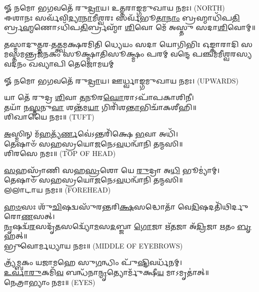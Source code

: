 \begin{center}
𑍐 𑌨𑌮𑍋 𑌭𑌗𑌵𑌤𑍇᳴ 𑌰𑍁\-\ul{𑌦𑍍𑌰𑌾}\-𑌯। 𑌉𑌤𑍍𑌤𑌰𑌾𑌙𑍍𑌗𑌮𑍁𑌖𑌾𑌯 𑌨𑌮𑌃। {\scriptsize (NORTH)}\\[1em]

𑌈𑌶𑌾𑌨𑌃 𑌸𑌰𑍍𑌵᳴𑌵𑌿\-\ul{𑌦𑍍𑌯𑌾}\-\-\ul{𑌨𑌾}\-𑌮𑍀𑌶𑍍𑌵𑌰𑌃 𑌸𑌰𑍍𑌵᳴𑌭𑍂\-\ul{𑌤𑌾}\-\-\ul{𑌨𑌾𑌂} 𑌬𑍍𑌰𑌹𑍍𑌮𑌾𑌧𑌿᳴𑌪\-\ul{𑌤𑌿}\-𑌰𑍍𑌬𑍍𑌰\-\ul{𑌹𑍍𑌮}\-𑌣𑍋𑌽𑌧𑌿᳴𑌪\-\ul{𑌤𑌿}\-𑌰𑍍𑌬𑍍𑌰𑌹𑍍𑌮𑌾᳴ \ul{𑌶𑌿}\-𑌵𑍋 𑌮𑍇᳴ 𑌅𑌸𑍍𑌤𑍁 𑌸𑌦𑌾\-\ul{𑌶𑌿}\-𑌵𑍋𑌮𑍍॥

{𑌤𑌸𑍍𑌮𑌾𑌦𑍁𑌤𑍍𑌤𑌰-𑌤𑌤𑍍𑌤𑍍𑌵𑌮𑌕𑍍𑌷𑌰𑌮𑌿𑌤𑌿 𑌧𑍍𑌯𑍇𑌯𑌂 𑌸𑌦𑌾 𑌯𑍋𑌗𑌿𑌭𑌿𑌃}
{𑌓𑌙𑍍𑌕𑌾𑌰𑌾𑌦𑌿 𑌸𑌮𑌸𑍍𑌤𑌮𑌨𑍍𑌤𑍍𑌰𑌜𑌨𑌕𑌂 𑌸𑍂𑌕𑍍𑌷𑍍𑌮𑌾𑌤𑌿𑌸𑍂𑌕𑍍𑌷𑍍𑌮𑌂 𑌪𑌰𑌮𑍍}
{𑌵𑌨𑍍𑌦𑍇 𑌪𑌞𑍍𑌚𑌮𑌮𑍀𑌶𑍍𑌵𑌰𑌸𑍍𑌯 𑌵𑌦𑌨𑌂 𑌖𑌵𑍍𑌯𑌾𑌪𑌿 𑌤𑍇𑌜𑍋𑌮𑌯𑌮𑍍}

𑍐 𑌨𑌮𑍋 𑌭𑌗𑌵𑌤𑍇᳴ 𑌰𑍁\-\ul{𑌦𑍍𑌰𑌾}\-𑌯। 𑌊𑌰𑍍𑌧𑍍𑌵𑌾𑌙𑍍𑌗𑌮𑍁𑌖𑌾𑌯 𑌨𑌮𑌃। {\scriptsize (UPWARDS)}\\[1em]

\end{center}


 𑌯𑌾 𑌤𑍇᳴ 𑌰𑍁𑌦𑍍𑌰 \ul{𑌶𑌿}\-𑌵𑌾 \ul{𑌤}\-𑌨𑍂𑌰\-\ul{𑌘𑍋}\-𑌰𑌾𑌽𑌪𑌾᳴𑌪𑌕𑌾𑌶𑌿𑌨𑍀।\\
 𑌤𑌯𑌾᳴ 𑌨\-\ul{𑌸𑍍𑌤}\-𑌨𑍁\-\ul{𑌵𑌾} 𑌶𑌨𑍍𑌤᳴𑌮\-\ul{𑌯𑌾} 𑌗𑌿𑌰𑌿᳴𑌶\-\ul{𑌨𑍍𑌤𑌾}\-𑌭𑌿𑌚𑌾᳴𑌕𑌶𑍀𑌹𑌿॥\\ 𑌶𑌿𑌖𑌾𑌯𑍈 𑌨𑌮𑌃॥ {\scriptsize (TUFT)}

\-\ul{𑌅}\-𑌸𑍍𑌮𑌿𑌨𑍍 𑌮᳴\-\ul{𑌹}\-𑌤𑍍𑌯᳴\-\ul{𑌰𑍍𑌣}\-𑌵𑍇॑𑌽𑌨𑍍𑌤𑌰𑌿᳴𑌕𑍍𑌷𑍇 \ul{𑌭}\-𑌵𑌾 𑌅𑌧𑌿᳴।\\
 𑌤𑍇𑌷𑌾𑍞᳴ 𑌸𑌹𑌸𑍍𑌰𑌯𑍋\-\ul{𑌜}\-𑌨𑍇𑌽\-\ul{𑌵}\-𑌧𑌨𑍍𑌵𑌾᳴𑌨𑌿 𑌤𑌨𑍍𑌮𑌸𑌿॥ \\
𑌶𑌿𑌰𑌸𑍇 𑌨𑌮𑌃॥ {\scriptsize (TOP OF HEAD)}

\-\ul{𑌸}\-𑌹𑌸𑍍𑌰𑌾᳴𑌣𑌿 𑌸𑌹\-\ul{𑌸𑍍𑌰}\-𑌶𑍋 𑌯𑍇 \ul{𑌰𑍁}\-𑌦𑍍𑌰𑌾 𑌅\-\ul{𑌧𑌿} 𑌭𑍂𑌮𑍍𑌯𑌾॑𑌮𑍍।\\
 𑌤𑍇𑌷𑌾𑍞᳴ 𑌸𑌹𑌸𑍍𑌰𑌯𑍋\-\ul{𑌜}\-𑌨𑍇𑌽\-\ul{𑌵}\-𑌧𑌨𑍍𑌵𑌾᳴𑌨𑌿 𑌤𑌨𑍍𑌮𑌸𑌿॥\\
𑌲𑌲𑌾𑌟𑌾𑌯 𑌨𑌮𑌃॥ {\scriptsize (FOREHEAD)}

\-\ul{𑌹}\-\-\ul{𑍞}\-𑌸𑌃 𑌶𑍁᳴\-\ul{𑌚𑌿}\-𑌷𑌦𑍍𑌵𑌸𑍁᳴𑌰𑌨𑍍𑌤𑌰𑌿\-\ul{𑌕𑍍𑌷}\-𑌸𑌦𑍍𑌧𑍋𑌤𑌾᳴ 𑌵𑍇\-\ul{𑌦𑌿}\-𑌷𑌦𑌤𑌿᳴𑌥𑌿𑌰𑍍𑌦𑍁𑌰𑍋\-\ul{𑌣}\-𑌸𑌤𑍍।\\
\-\ul{𑌨𑍃}\-𑌷𑌦𑍍𑌵᳴\-\ul{𑌰}\-𑌸𑌦𑍃᳴\-\ul{𑌤}\-𑌸𑌦𑍍𑌵𑍍𑌯𑍋᳴\-\ul{𑌮}\-𑌸\-\ul{𑌦}\-𑌬𑍍𑌜𑌾 \ul{𑌗𑍋}\-𑌜𑌾 𑌋᳴\-\ul{𑌤}\-𑌜𑌾 𑌅᳴\-\ul{𑌦𑍍𑌰𑌿}\-𑌜𑌾 \ul{𑌋}\-𑌤𑌂 \ul{𑌬𑍃}\-𑌹𑌤𑍍॥\\
𑌭𑍍𑌰𑍁𑌵𑍋𑌰𑍍𑌮𑌧𑍍𑌯𑌾𑌯 𑌨𑌮𑌃॥ {\scriptsize (MIDDLE OF EYEBROWS)}


𑌤𑍍𑌰𑍍𑌯᳴𑌮𑍍𑌬𑌕𑌂 𑌯𑌜𑌾𑌮𑌹𑍇 𑌸𑍁\-\ul{𑌗}\-𑌨𑍍𑌧𑌿𑌂 𑌪𑍁᳴\-\ul{𑌷𑍍𑌟𑌿}\-𑌵𑌰𑍍𑌧᳴𑌨𑌮𑍍।\\
 \ul{𑌉}\-\-\ul{𑌰𑍍𑌵𑌾}\-\-\ul{𑌰𑍁}\-𑌕𑌮𑌿᳴\-\ul{𑌵} 𑌬𑌨𑍍𑌧᳴𑌨𑌾\-\ul{𑌨𑍍𑌮𑍃}\-𑌤𑍍𑌯𑍋𑌰𑍍𑌮𑍁᳴𑌕𑍍𑌷𑍀\-\ul{𑌯} 𑌮𑌾𑌽𑌮𑍃𑌤𑌾॑𑌤𑍍॥\\
𑌨𑍇𑌤𑍍𑌰𑌾𑌭𑍍𑌯𑌾𑌂 𑌨𑌮𑌃॥ {\scriptsize (EYES)}

